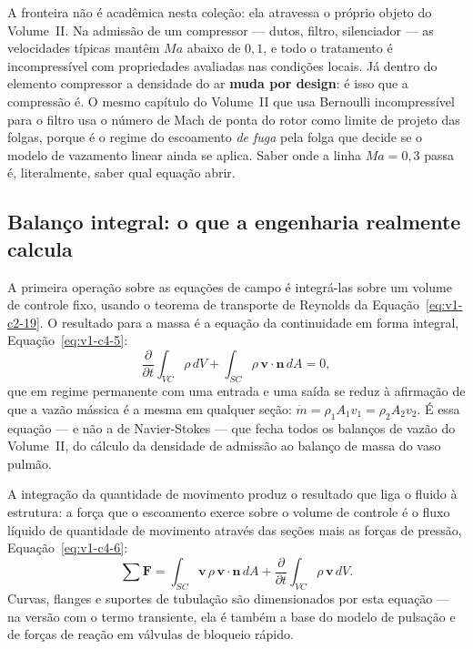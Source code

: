 \documentclass[12pt,a4paper]{article}
\numberwithin{equation}{section}
\numberwithin{table}{section}
\numberwithin{figure}{section}
\begin{document}
A fronteira não é acadêmica nesta coleção: ela atravessa o próprio objeto do
Volume~II. Na admissão de um compressor --- dutos, filtro, silenciador --- as
velocidades típicas mantêm $Ma$ abaixo de $0{,}1$, e todo o tratamento é
incompressível com propriedades avaliadas nas condições locais. Já dentro do
elemento compressor a densidade do ar \textbf{muda por design}: é isso que a
compressão é. O mesmo capítulo do Volume~II que usa Bernoulli incompressível
para o filtro usa o número de Mach de ponta do rotor como limite de projeto
das folgas, porque é o regime do escoamento \emph{de fuga} pela folga que
decide se o modelo de vazamento linear ainda se aplica. Saber onde a linha
$Ma = 0{,}3$ passa é, literalmente, saber qual equação abrir.

\subsection{Balanço integral: o que a engenharia realmente
calcula}\label{sub:v1-c4-integral}

A primeira operação sobre as equações de campo é integrá-las sobre um volume
de controle fixo, usando o teorema de transporte de Reynolds da
Equação~\eqref{eq:v1-c2-19}. O resultado para a massa é a equação da
continuidade em forma integral, Equação~\eqref{eq:v1-c4-5}:
\begin{equation}\label{eq:v1-c4-5}
\frac{\partial}{\partial t}\int_{VC}\rho\,dV +
\int_{SC}\rho\,\mathbf{v}\cdot\mathbf{n}\,dA = 0 ,
\end{equation}
que em regime permanente com uma entrada e uma saída se reduz à afirmação de
que a vazão mássica é a mesma em qualquer seção: $\dot{m} = \rho_1 A_1 v_1 =
\rho_2 A_2 v_2$. É essa equação --- e não a de Navier-Stokes --- que fecha
todos os balanços de vazão do Volume~II, do cálculo da densidade de admissão
ao balanço de massa do vaso pulmão.

A integração da quantidade de movimento produz o resultado que liga o fluido
à estrutura: a força que o escoamento exerce sobre o volume de controle é o
fluxo líquido de quantidade de movimento através das seções mais as forças de
pressão, Equação~\eqref{eq:v1-c4-6}:
\begin{equation}\label{eq:v1-c4-6}
\sum\mathbf{F} = \int_{SC}\mathbf{v}\,\rho\,\mathbf{v}\cdot\mathbf{n}\,dA +
\frac{\partial}{\partial t}\int_{VC}\rho\,\mathbf{v}\,dV .
\end{equation}
Curvas, flanges e suportes de tubulação são dimensionados por esta equação ---
na versão com o termo transiente, ela é também a base do modelo de pulsação e
de forças de reação em válvulas de bloqueio rápido.
\end{document}

